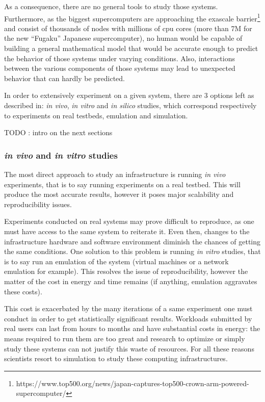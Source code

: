 \documentclass[12pt, a4paper]{memoir}
\begin{document}
As a consequence, there are no general tools to study those systems.
Furthermore, as the biggest supercomputers are approaching the exascale
barrier\footnote{https://www.top500.org/news/japan-captures-top500-crown-arm-powered-supercomputer/}
and consist of thousands of nodes with millions of cpu cores (more than 7M for
the new ``Fugaku'' Japanese supercomputer), no human would be capable of
building a general mathematical model that would be accurate enough to predict
the behavior of those systems under varying conditions. Also, interactions
between the various components of those systems may lead to unexpected
behavior\cite{10.1007/978-3-319-09873-9_12} that can hardly be predicted.

In order to extensively experiment on a given system, there are 3 options left
as described in\cite{legrand2015scheduling}: \textit{in vivo}, \textit{in
vitro} and \textit{in silico} studies, which correspond respectively to
experiments on real testbeds, emulation and simulation.  

TODO : intro on the next sections

\subsubsection{\textit{in vivo} and \textit{in vitro} studies}

The most direct approach to study an infrastructure is running \textit{in vivo}
experiments, that is to say running experiments on a real testbed. This will
produce the most accurate results, however it poses major scalability and
reproducibility issues.

Experiments conducted on real systems may prove difficult to reproduce, as one
must have access to the same system to reiterate it. Even then, changes to the
infrastructure hardware and software environment diminish the chances of
getting the same conditions. One solution to this problem is running \textit{in
vitro} studies, that is to say run an emulation of the system (virtual machines
or a network emulation for example). This resolves the issue of
reproducibility, however the matter of the cost in energy and time remains (if
anything, emulation aggravates these costs).

This cost is exacerbated by the many iterations of a same experiment one must
conduct in order to get statistically significant results. Workloads submitted
by real users can last from hours to months and have substantial costs in
energy: the means required to run them are too great and research to optimize
or simply study these systems can not justify this waste of resources. For all
these reasons scientists resort to simulation to study these computing
infrastructures.
\end{document}
